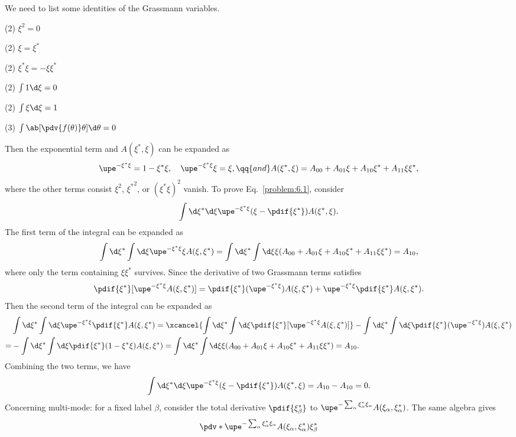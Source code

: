 \begin{solution}
  We need to list some identities of the Grassmann variables.
  \begin{enumext*}[columns = 13]
    \item(2) $\xi^2 = 0$
    \item(2) $\xi = \xi^*$
    \item(2) $\xi^* \xi = -\xi \xi^*$
    \item(2) $\int 1 \d\xi = 0$
    \item(2) $\int \xi \d\xi = 1$
    \item(3) $\int \ab[\pdv{f(\theta)}\theta] \d\theta = 0$
  \end{enumext*}
  Then the exponential term and $A(\xi^*, \xi)$ can be expanded as
  \[
    \upe^{-\xi^*\xi} = 1 - \xi^*\xi, \quad \upe^{-\xi^*\xi} \xi = \xi, \qq{and}
    A(\xi^*, \xi) = A_{00} + A_{01}\xi + A_{10}\xi^* + A_{11}\xi\xi^*,
  \]
  where the other terms consist $\xi^2$, ${\xi^*}^2$, or $(\xi^*\xi)^2$ vanish.
  To prove Eq.~\eqref{problem:6.1}, consider
  \[
    \int \d\xi^* \d\xi \upe^{-\xi^*\xi} (\xi - \pdif{\xi^*}) A(\xi^*, \xi).
  \]
  The first term of the integral can be expanded as
  \[
    \int \d\xi^* \int \d\xi \upe^{-\xi^*\xi} \xi A(\xi, \xi^*)
  = \int \d\xi^* \int \d\xi  \xi (A_{00} + A_{01}\xi + A_{10}\xi^* + A_{11}\xi\xi^*)
  = A_{10},
  \]
  where only the term containing $\xi\xi^*$ survives.
  Since the derivative of two Grassmann terms satisfies
  \[
    \pdif{\xi^*}[\upe^{-\xi^*\xi} A(\xi, \xi^*)]
  = \pdif{\xi^*}(\upe^{-\xi^*\xi}) A(\xi, \xi^*)
  + \upe^{-\xi^*\xi} \pdif{\xi^*} A(\xi, \xi^*).
  \]
  Then the second term of the integral can be expanded as
  \begin{align*}
  & \int \d\xi^* \int \d\xi \upe^{-\xi^*\xi} \pdif{\xi^*} A(\xi, \xi^*)
= \xcancel{\int \d\xi^* \int \d\xi \pdif{\xi^*}[\upe^{-\xi^*\xi} A(\xi, \xi^*)]}
  - \int \d\xi^* \int \d\xi \pdif{\xi^*}(\upe^{-\xi^*\xi}) A(\xi, \xi^*)\\
= & - \int \d\xi^* \int \d\xi \pdif{\xi^*}(1 - \xi^*\xi) A(\xi, \xi^*)
= \int \d\xi^* \int \d\xi \xi
  (A_{00} + A_{01}\xi + A_{10}\xi^* + A_{11}\xi\xi^*)
= A_{10}.
  \end{align*}
  Combining the two terms, we have
  \[
    \int \d\xi^* \d\xi \upe^{-\xi^*\xi} (\xi - \pdif{\xi^*}) A(\xi^*, \xi)
  = A_{10} - A_{10} = 0.
  \]
  Concerning multi-mode: for a fixed label $\beta$, consider the total
  derivative $\pdif{\xi_\beta^*}$ to
  $\upe^{-\sum_\alpha\xi_\alpha^*\xi_\alpha} A(\xi_\alpha, \xi_\alpha^*)$.
  The same algebra gives
  \[
    \pdv*{\upe^{-\sum_\alpha\xi_\alpha^*\xi_\alpha} A(\xi_\alpha, \xi_\alpha^*)}{\xi_\beta^*}
\]
\end{solution}
